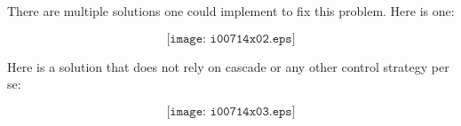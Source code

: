 
There are multiple solutions one could implement to fix this problem.  Here is one:

$$\texttt{[image: i00714x02.eps]}$$







Here is a solution that does not rely on cascade or any other control strategy per se:

$$\texttt{[image: i00714x03.eps]}$$




